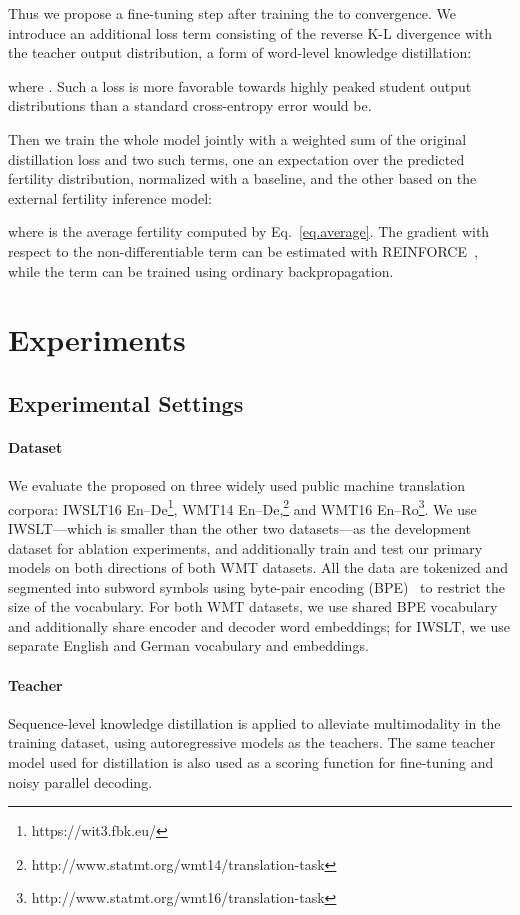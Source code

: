 \documentclass{article} \usepackage{iclr2018_conference,times}
\begin{document}
Thus we propose a fine-tuning step after training the \model{} to convergence. We introduce an additional loss term consisting of the reverse K-L divergence with the teacher output distribution, a form of word-level knowledge distillation:

where . Such a loss is more favorable towards highly peaked student output distributions than a standard cross-entropy error would be.

Then we train the whole model jointly with a weighted sum of the original distillation loss and two such terms, one an expectation over the predicted fertility distribution, normalized with a baseline, and the other based on the external fertility inference model:

where  is the average fertility computed by Eq.~\ref{eq.average}.
The gradient with respect to the non-differentiable  term can be estimated with REINFORCE~\citep{williams1992simple}, while the  term can be trained using ordinary backpropagation.

\section{Experiments}
\subsection{Experimental Settings}
\vspace{-5pt}
\paragraph{Dataset} We evaluate the proposed \model{} on three widely used public machine translation corpora: IWSLT16 En--De\footnote{https://wit3.fbk.eu/}, WMT14 En--De,\footnote{http://www.statmt.org/wmt14/translation-task} and WMT16 En--Ro\footnote{http://www.statmt.org/wmt16/translation-task}. We use IWSLT---which is smaller than the other two datasets---as the development dataset for ablation experiments, and additionally train and test our primary models on both directions of both WMT datasets.
All the data are tokenized and segmented into subword symbols using byte-pair encoding (BPE)~\citep{sennrich2015neural} to restrict the size of the vocabulary. For both WMT datasets, we use shared BPE vocabulary and additionally share encoder and decoder word embeddings; for IWSLT, we use separate English and German vocabulary and embeddings.
\vspace{-5pt}
\paragraph{Teacher} Sequence-level knowledge distillation is applied to alleviate multimodality in the training dataset, using autoregressive models as the teachers. The same teacher model used for distillation is also used as a scoring function for fine-tuning and noisy parallel decoding.
\end{document}
